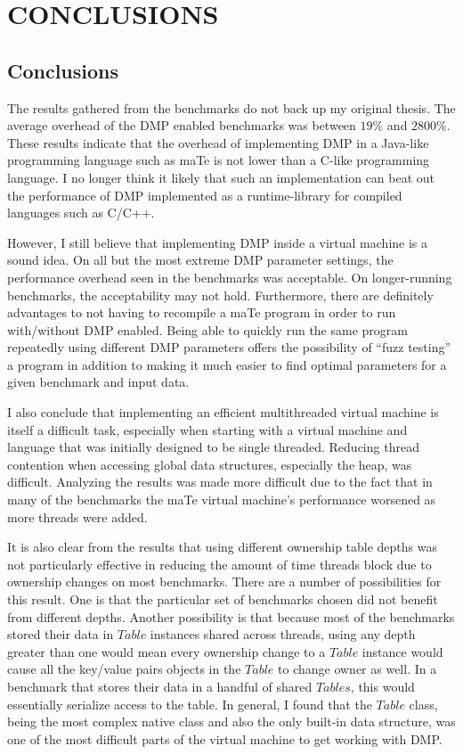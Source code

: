 \chapter{CONCLUSIONS}
\label{CONCLUSIONS}

\section{Conclusions}

The results gathered from the benchmarks do not back up my original
thesis.  The average overhead of the DMP enabled benchmarks was
between $19\%$ and $2800\%$.  These results indicate that the overhead
of implementing DMP in a Java-like programming language such as maTe
is not lower than a C-like programming language.  I no longer think it
likely that such an implementation can beat out the performance of DMP
implemented as a runtime-library for compiled languages such as C/C++.

However, I still believe that implementing DMP inside a virtual
machine is a sound idea.  On all but the most extreme DMP parameter
settings, the performance overhead seen in the benchmarks was
acceptable.  On longer-running benchmarks, the acceptability may not
hold.  Furthermore, there are definitely advantages to not having to
recompile a maTe program in order to run with/without DMP enabled.
Being able to quickly run the same program repeatedly using different
DMP parameters offers the possibility of ``fuzz testing'' a program in
addition to making it much easier to find optimal parameters for a
given benchmark and input data.

I also conclude that implementing an efficient multithreaded virtual
machine is itself a difficult task, especially when starting with a
virtual machine and language that was initially designed to be single
threaded.  Reducing thread contention when accessing global data
structures, especially the heap, was difficult.  Analyzing the results
was made more difficult due to the fact that in many of the benchmarks
the maTe virtual machine's performance worsened as more threads were
added.

It is also clear from the results that using different ownership table
depths was not particularly effective in reducing the amount of time
threads block due to ownership changes on most benchmarks.  There are
a number of possibilities for this result.  One is that the particular
set of benchmarks chosen did not benefit from different depths.
Another possibility is that because most of the benchmarks stored
their data in $Table$ instances shared across threads, using any depth
greater than one would mean every ownership change to a $Table$
instance would cause all the key/value pairs objects in the $Table$ to
change owner as well.  In a benchmark that stores their data in a
handful of shared $Tables$, this would essentially serialize access to
the table.  In general, I found that the $Table$ class, being the most
complex native class and also the only built-in data structure, was
one of the most difficult parts of the virtual machine to get working
with DMP.

